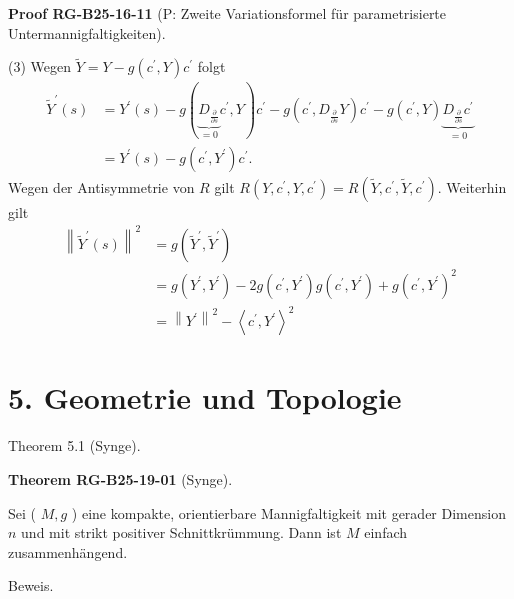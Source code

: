\documentclass[10pt, letterpaper]{article}
\newcommand{\CustomHeading}[3]{%
  \par\medskip\noindent%
  \textbf{#1 #2} \textnormal{(#3)}.\enskip%
}
\newenvironment{THEO}[2]{\begin{unitbox}\CustomHeading{Theorem}{#1}{#2}}{\end{unitbox}}
\newenvironment{PROOF}[2]{\begin{unitbox}\CustomHeading{Proof}{#1}{#2}}{\end{unitbox}}
\begin{document}
\begin{PROOF}{RG-B25-16-11}{P: Zweite Variationsformel für parametrisierte Untermannigfaltigkeiten}
(3) Wegen $\tilde{Y}=Y-g\left(c^{\prime}, Y\right) c^{\prime}$ folgt
$$
\begin{aligned}
\tilde{Y}^{\prime}(s) & =Y^{\prime}(s)-g(\underbrace{D_{\frac{\partial}{\partial s}}}_{=0} c^{\prime}, Y) c^{\prime}-g\left(c^{\prime}, D_{\frac{\partial}{\partial s}} Y\right) c^{\prime}-g\left(c^{\prime}, Y\right) \underbrace{D_{\frac{\partial}{\partial s}} c^{\prime}}_{=0} \\
& =Y^{\prime}(s)-g\left(c^{\prime}, Y^{\prime}\right) c^{\prime} .
\end{aligned}
$$
Wegen der Antisymmetrie von $R$ gilt $R\left(Y, c^{\prime}, Y, c^{\prime}\right)=R\left(\tilde{Y}, c^{\prime}, \tilde{Y}, c^{\prime}\right)$. Weiterhin gilt
$$
\begin{aligned}
\left\|\tilde{Y}^{\prime}(s)\right\|^{2} & =g\left(\tilde{Y}^{\prime}, \tilde{Y}^{\prime}\right) \\
& =g\left(Y^{\prime}, Y^{\prime}\right)-2 g\left(c^{\prime}, Y^{\prime}\right) g\left(c^{\prime}, Y^{\prime}\right)+g\left(c^{\prime}, Y^{\prime}\right)^{2} \\
& =\left\|Y^{\prime}\right\|^{2}-\left\langle c^{\prime}, Y^{\prime}\right\rangle^{2}
\end{aligned}
$$
\end{PROOF}


\pagebreak



\section*{5. Geometrie und Topologie}


Theorem 5.1 (Synge). 

\begin{THEO}{RG-B25-19-01}{Synge}
Sei ( $M, g$ ) eine kompakte, orientierbare Mannigfaltigkeit mit gerader Dimension $n$ und mit strikt positiver Schnittkrümmung. Dann ist $M$ einfach zusammenhängend.
\end{THEO}

Beweis. 
\end{document}
